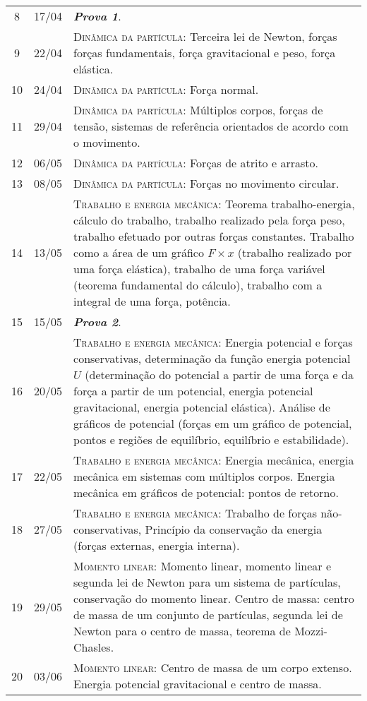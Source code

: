 \begin{center}
\begin{longtable}{ccp{70mm}}
8	 & 	17/04	 & 	\textbf{\textit{Prova 1}}. \\
9	 & 	22/04	 & 	\textsc{Dinâmica da partícula:} Terceira lei de Newton, forças forças fundamentais, força gravitacional e peso, força elástica. \\
10	 & 	24/04	 & 	\textsc{Dinâmica da partícula:} Força normal. \\
11	 & 	29/04	 & 	\textsc{Dinâmica da partícula:} Múltiplos corpos, forças de tensão, sistemas de referência orientados de acordo com o movimento. \\
12	 & 	06/05	 & 	\textsc{Dinâmica da partícula:} Forças de atrito e arrasto. \\
13	 & 	08/05	 & 	\textsc{Dinâmica da partícula:} Forças no movimento circular. \\
14	 & 	13/05	 & 	\textsc{Trabalho e energia mecânica:} Teorema trabalho-energia, cálculo do trabalho, trabalho realizado pela força peso, trabalho efetuado por outras forças constantes. Trabalho como a área de um gráfico $F \times x$ (trabalho realizado por uma força elástica), trabalho de uma força variável (teorema fundamental do cálculo), trabalho com a integral de uma força, potência. \\
15	 & 	15/05	 & 	\textbf{\textit{Prova 2}}. \\
16	 & 	20/05	 & 	\textsc{Trabalho e energia mecânica:} Energia potencial e forças conservativas, determinação da função energia potencial $U$ (determinação do potencial a partir de uma força e da força a partir de um potencial, energia potencial gravitacional, energia potencial elástica). Análise de gráficos de potencial (forças em um gráfico de potencial, pontos e regiões de equilíbrio, equilíbrio e estabilidade). \\
17	 & 	22/05	 & 	\textsc{Trabalho e energia mecânica:} Energia mecânica, energia mecânica em sistemas com múltiplos corpos. Energia mecânica em gráficos de potencial: pontos de retorno. \\
18	 & 	27/05	 & 	\textsc{Trabalho e energia mecânica:} Trabalho de forças não-conservativas, Princípio da conservação da energia (forças externas, energia interna). \\
19	 & 	29/05	 & 	\textsc{Momento linear:} Momento linear, momento linear e segunda lei de Newton para um sistema de partículas, conservação do momento linear. Centro de massa: centro de massa de um conjunto de partículas, segunda lei de Newton para o centro de massa, teorema de Mozzi-Chasles. \\
20	 & 	03/06	 & 	\textsc{Momento linear:} Centro de massa de um corpo extenso. Energia potencial gravitacional e centro de massa. \\

\end{longtable}
\end{center}
